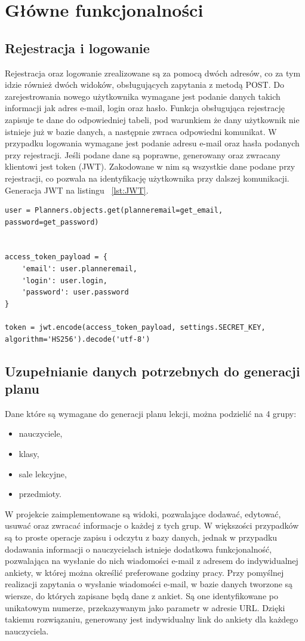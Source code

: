 \section{Główne funkcjonalności}
\subsection{Rejestracja i logowanie}
Rejestracja oraz logowanie zrealizowane są za pomocą dwóch adresów, co za tym idzie również dwóch widoków, obsługujących zapytania z metodą POST. Do zarejestrowania nowego użytkownika wymagane jest podanie danych takich informacji jak adres e-mail, login oraz hasło. Funkcja obsługująca rejestrację zapisuje te dane do odpowiedniej tabeli, pod warunkiem że dany użytkownik nie istnieje już w bazie danych, a następnie zwraca odpowiedni komunikat. W przypadku logowania wymagane jest podanie adresu e-mail oraz hasła podanych przy rejestracji. Jeśli podane dane są poprawne, generowany oraz zwracany klientowi jest token (JWT). Zakodowane w nim są wszystkie dane podane przy rejestracji, co pozwala na identyfikację użytkownika przy dalszej komunikacji. Generacja JWT na listingu ~\ref{lst:JWT}. 

\begin{lstlisting}[caption=Widok obsługujący zapytanie typu POST, label={lst:JWT}]
user = Planners.objects.get(planneremail=get_email, password=get_password)


access_token_payload = {
	'email': user.planneremail,
	'login': user.login,
	'password': user.password
}

token = jwt.encode(access_token_payload, settings.SECRET_KEY, algorithm='HS256').decode('utf-8')
\end{lstlisting}

\subsection{Uzupełnianie danych potrzebnych do generacji planu}
Dane które są wymagane do generacji planu lekcji, można podzielić na 4 grupy:
\begin{itemize}
	\item nauczyciele,
	\item klasy,
	\item sale lekcyjne,
	\item przedmioty.
\end{itemize}

W projekcie zaimplementowane są widoki, pozwalające dodawać, edytować, usuwać oraz zwracać informacje o każdej z tych grup. W większości przypadków są to proste operacje zapisu i odczytu z bazy danych, jednak w przypadku dodawania informacji o nauczycielach istnieje dodatkowa funkcjonalność, pozwalająca na wysłanie do nich wiadomości e-mail z adresem do indywidualnej ankiety, w której można określić preferowane godziny pracy. Przy pomyślnej realizacji zapytania o wysłanie wiadomości e-mail, w bazie danych tworzone są wiersze, do których zapisane będą dane z ankiet. Są one identyfikowane po unikatowym numerze, przekazywanym jako parametr w adresie URL. Dzięki takiemu rozwiązaniu, generowany jest indywidualny link do ankiety dla każdego nauczyciela.
